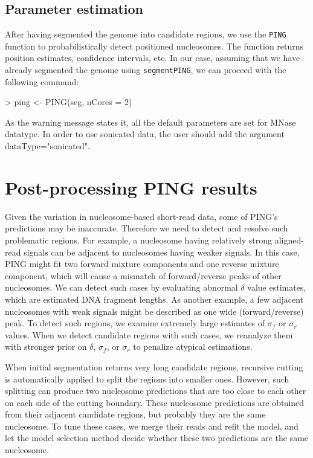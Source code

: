 \documentclass[11pt]{article}
\begin{document}
\subsection{Parameter estimation}
After having segmented the genome into candidate regions, we use the \texttt{PING} function to probabilistically detect positioned nucleosomes.
The function returns position estimates, confidence intervals, etc. In our case, assuming that we have already segmented the genome using \texttt{segmentPING}, we can proceed with the following command: 

\begin{Schunk}
\begin{Sinput}
> ping <- PING(seg, nCores = 2)
\end{Sinput}
\end{Schunk}

As the warning message states it, all the default parameters are set for MNase datatype. In order to use sonicated data, the user should add the argument dataType="sonicated".


\section{Post-processing PING results}
Given the variation in nucleosome-based short-read data, some of PING's predictions may be inaccurate. Therefore we need to detect and resolve such problematic regions. 
For example, a nucleosome having relatively strong aligned-read signals can be adjacent to nucleosomes having weaker signals. In this case, PING might fit two forward mixture components and one reverse mixture component, which will cause a mismatch of forward/reverse peaks of other nucleosomes. We can detect such cases by evaluating abnormal $\delta$ value estimates, which are estimated DNA fragment lengths. 
As another example, a few adjacent nucleosomes with weak signals might be described as one wide (forward/reverse) peak. To detect such regions, we examine extremely large estimates of $\sigma_f$ or $\sigma_r$ values. When we detect candidate regions with such cases, we reanalyze them with stronger prior on $\delta$,  $\sigma_f$, or $\sigma_r$ to penalize atypical estimations.

When initial segmentation returns very long candidate regions, recursive cutting is automatically applied to split the regions into smaller ones. However, such splitting can produce two nucleosome predictions that are too close to each other on each side of the cutting boundary. These nucleosome predictions are obtained from their adjacent candidate regions, but probably they are the same nucleosome. To tune these cases, we merge their reads and refit the model, and let the model selection method decide whether these two predictions are the same nucleosome.
\end{document}
